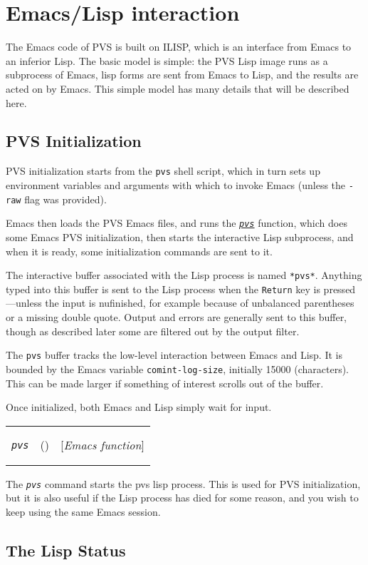 \documentclass[12pt]{book}
\makeatletter
\newenvironment{function}[3]%
{\par\noindent\begin{boxedminipage}{\textwidth}%
 \par\noindent\begin{tabularx}{\linewidth}{l>{\raggedright}Xr}%
 \functionhtgt{#1}&(\texttt{\textit{#2}})&[\emph{#3}]%
 \end{tabularx}\par\flushright\begin{minipage}{.97\textwidth}}
{\end{minipage}\end{boxedminipage}}
\newcommand{\functionnm}[1]{\texttt{\textit{#1}}}
\newcommand{\functionhln}[1]{\hyperlink{#1}{\functionnm{#1}}}
\newcommand{\functionhtgt}[1]{\hypertarget{#1}{\functionnm{#1}}\index{#1@\functionnm{#1}|underline}}
\newenvironment{emacsfunction}[2]%
{\begin{function}{#1}{#2}{Emacs function}}{\end{function}}
\newcommand{\globalnm}[1]{\texttt{\textup{#1}}}
\makeatother
\begin{document}
\section{Emacs/Lisp interaction}

The Emacs code of PVS is built on ILISP, which is an interface from Emacs
to an inferior Lisp.  The basic model is simple: the PVS Lisp image runs
as a subprocess of Emacs, lisp forms are sent from Emacs to Lisp, and the
results are acted on by Emacs.  This simple model has many details that
will be described here.

\subsection{PVS Initialization}

PVS initialization starts from the \texttt{pvs} shell script, which in
turn sets up environment variables and arguments with which to invoke
Emacs (unless the \texttt{-raw} flag was provided).

Emacs then loads the PVS Emacs files, and runs the \functionhln{pvs}
function, which does some Emacs PVS initialization, then starts the
interactive Lisp subprocess, and when it is ready, some initialization
commands are sent to it.

The interactive buffer associated with the Lisp process is named
\texttt{*pvs*}.  Anything typed into this buffer is sent to the Lisp
process when the \texttt{Return} key is pressed---unless the input is
nufinished, for example because of unbalanced parentheses or a missing
double quote.  Output and errors are generally sent to this buffer, though
as described later some are filtered out by the output filter.

The \texttt{pvs} buffer tracks the low-level interaction between Emacs and
Lisp.  It is bounded by the Emacs variable \globalnm{comint-log-size},
initially 15000 (characters).  This can be made larger if something of
interest scrolls out of the buffer.

Once initialized, both Emacs and Lisp simply wait for input.

\begin{emacsfunction}{pvs}{}
The \functionnm{pvs} command starts the pvs lisp process.  This is used
for PVS initialization, but it is also useful if the Lisp process has died
for some reason, and you wish to keep using the same Emacs session.
\end{emacsfunction}

\subsection{The Lisp Status}
\end{document}
